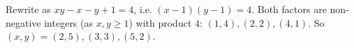 Rewrite as $xy-x-y+1=4$, i.e. $(x-1)(y-1)=4$. Both factors are non-negative integers (as $x,y\ge1$) with product $4$: $(1,4),(2,2),(4,1)$. So $(x,y)=\boxed{(2,5),(3,3),(5,2)}$.
